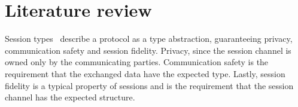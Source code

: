 \section{Literature review}
\label{litreview}

%

%
%


Session types~\cite{HondaK:typdi, HondaK:intblt1, HondaK:lanptd} describe a protocol as a type abstraction, guaranteeing privacy, communication safety and session fidelity. Privacy, since the session channel is owned only by the communicating parties. Communication safety is the requirement that the exchanged data have the expected type. Lastly, session fidelity is a typical property of sessions and is the requirement that the session channel has the expected structure.


